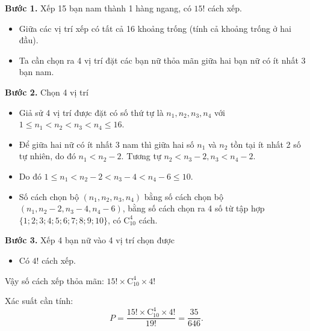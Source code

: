 \documentclass[12pt, a4paper]{article}
\newcommand{\C}[2]{\mathrm{C}_{#1}^{#2}}
\begin{document}
		\noindent \textbf{Bước 1.} Xếp 15 bạn nam thành 1 hàng ngang, có \(15!\) cách xếp.
		\begin{itemize}
			\item Giữa các vị trí xếp có tất cả 16 khoảng trống (tính cả khoảng trống ở hai đầu).
			\item Ta cần chọn ra 4 vị trí đặt các bạn nữ thỏa mãn giữa hai bạn nữ có ít nhất 3 bạn nam.
		\end{itemize}
		
		\noindent \textbf{Bước 2.} Chọn 4 vị trí
		\begin{itemize}
			\item Giả sử 4 vị trí được đặt có số thứ tự là \(n_1, n_2, n_3, n_4\) với \(1 \le n_1 < n_2 < n_3 < n_4 \le 16\).
			\item Để giữa hai nữ có ít nhất 3 nam thì giữa hai số \(n_1\) và \(n_2\) tồn tại ít nhất 2 số tự nhiên, do đó \(n_1 < n_2 - 2\). Tương tự \(n_2 < n_3 - 2, n_3 < n_4 - 2\).
			\item Do đó \(1 \le n_1 < n_2 - 2 < n_3 - 4 < n_4 - 6 \le 10\).
			\item Số cách chọn bộ \((n_1, n_2, n_3, n_4)\) bằng số cách chọn bộ \((n_1, n_2 - 2, n_3 - 4, n_4 - 6)\), bằng số cách chọn ra 4 số từ tập hợp \(\{1; 2; 3; 4; 5; 6; 7; 8; 9; 10\}\), có \(\C{10}{4}\) cách.
		\end{itemize}
		
		\noindent \textbf{Bước 3.} Xếp 4 bạn nữ vào 4 vị trí chọn được
		\begin{itemize}
			\item Có \(4!\) cách xếp.
		\end{itemize}
		
		\noindent Vậy số cách xếp thỏa mãn: \(15! \times \C{10}{4} \times 4!\)
		
		\noindent Xác suất cần tính:
		\[
		P = \frac{15! \times \C{10}{4} \times 4!}{19!} = \frac{35}{646}.
		\]
	
		\vspace{0.5cm}
		
\end{document}
